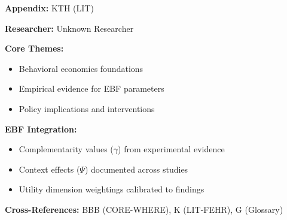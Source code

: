 \begin{tcolorbox}[colback=blue!5!white, colframe=blue!75!black,
    title=Quick Reference: Unknown Researcher Research]

\textbf{Appendix:} KTH (LIT)

\textbf{Researcher:} Unknown Researcher

\textbf{Core Themes:}
\begin{itemize}[nosep]
\item Behavioral economics foundations
\item Empirical evidence for EBF parameters
\item Policy implications and interventions
\end{itemize}

\textbf{EBF Integration:}
\begin{itemize}[nosep]
\item Complementarity values ($\gamma$) from experimental evidence
\item Context effects ($\Psi$) documented across studies
\item Utility dimension weightings calibrated to findings
\end{itemize}

\textbf{Cross-References:} BBB (CORE-WHERE), K (LIT-FEHR), G (Glossary)
\end{tcolorbox}


